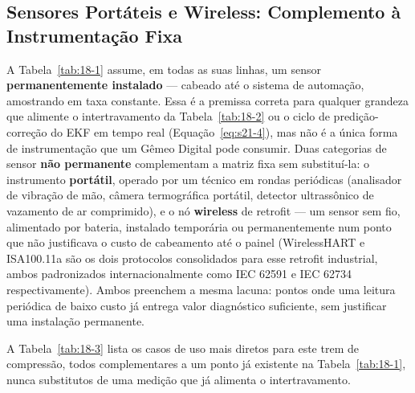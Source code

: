 \documentclass[12pt,a4paper]{article}
\numberwithin{equation}{section}
\numberwithin{table}{section}
\numberwithin{figure}{section}
\begin{document}
\subsection{Sensores Portáteis e Wireless: Complemento à Instrumentação Fixa}

A Tabela~\ref{tab:18-1} assume, em todas as suas linhas, um sensor \textbf{permanentemente instalado} — cabeado até o sistema de automação, amostrando em taxa constante. Essa é a premissa correta para qualquer grandeza que alimente o intertravamento da Tabela~\ref{tab:18-2} ou o ciclo de predição-correção do EKF em tempo real (Equação~\eqref{eq:s21-4}), mas não é a única forma de instrumentação que um Gêmeo Digital pode consumir. Duas categorias de sensor \textbf{não permanente} complementam a matriz fixa sem substituí-la: o instrumento \textbf{portátil}, operado por um técnico em rondas periódicas (analisador de vibração de mão, câmera termográfica portátil, detector ultrassônico de vazamento de ar comprimido), e o nó \textbf{wireless} de retrofit — um sensor sem fio, alimentado por bateria, instalado temporária ou permanentemente num ponto que não justificava o custo de cabeamento até o painel (WirelessHART e ISA100.11a são os dois protocolos consolidados para esse retrofit industrial, ambos padronizados internacionalmente como IEC 62591 e IEC 62734 respectivamente). Ambos preenchem a mesma lacuna: pontos onde uma leitura periódica de baixo custo já entrega valor diagnóstico suficiente, sem justificar uma instalação permanente.

A Tabela~\ref{tab:18-3} lista os casos de uso mais diretos para este trem de compressão, todos complementares a um ponto já existente na Tabela~\ref{tab:18-1}, nunca substitutos de uma medição que já alimenta o intertravamento.
\end{document}
